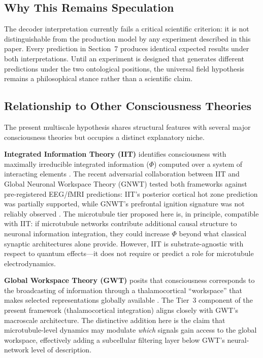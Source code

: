 \documentclass[10pt, a4paper, twocolumn]{article}
\begin{document}
\subsection{Why This Remains Speculation}

The decoder interpretation currently fails a critical scientific
criterion: it is not distinguishable from the production model by any
experiment described in this paper. Every prediction in Section~7
produces identical expected results under both interpretations. Until an
experiment is designed that generates different predictions under the two
ontological positions, the universal field hypothesis remains a
philosophical stance rather than a scientific claim.

\subsection{Relationship to Other Consciousness Theories}

The present multiscale hypothesis shares structural features with
several major consciousness theories but occupies a distinct
explanatory niche.

\textbf{Integrated Information Theory (IIT)} identifies
consciousness with maximally irreducible integrated information
($\Phi$) computed over a system of interacting elements
\cite{tononi2016}. The recent adversarial collaboration between
IIT and Global Neuronal Workspace Theory (GNWT) tested both
frameworks against pre-registered EEG/fMRI predictions:
IIT's posterior cortical hot zone prediction was partially
supported, while GNWT's prefrontal ignition signature was
not reliably observed \cite{melloni2025}. The microtubule
tier proposed here is, in principle, compatible with IIT:
if microtubule networks contribute additional causal structure
to neuronal information integration, they could increase
$\Phi$ beyond what classical synaptic architectures alone
provide. However, IIT is substrate-agnostic with respect to
quantum effects---it does not require or predict a role for
microtubule electrodynamics.

\textbf{Global Workspace Theory (GWT)} posits that consciousness
corresponds to the broadcasting of information through a
thalamocortical ``workspace'' that makes selected representations
globally available \cite{dehaene2011}. The Tier~3 component of
the present framework (thalamocortical integration) aligns
closely with GWT's macroscale architecture. The distinctive
addition here is the claim that microtubule-level dynamics may
modulate \emph{which} signals gain access to the global
workspace, effectively adding a subcellular filtering layer
below GWT's neural-network level of description.
\end{document}

